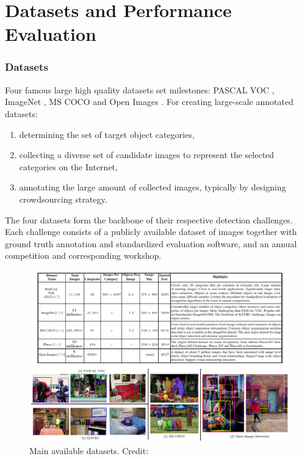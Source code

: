 \documentclass{beamer}
\begin{document}
\part{Datasets and Performance Evaluation}
\begin{frame}
	\partpage
\end{frame}


\section{Datasets}


\begin{frame}
    Four famous large high quality datasets set milestones: PASCAL VOC \cite{everingham_pascal_2010}, ImageNet \cite{krizhevsky_imagenet_2017}, MS COCO \cite{lin_microsoft_2015} and Open Images \cite{kuznetsova_open_2020}. For creating large-scale annotated datasets:
    \begin{enumerate}
        \item determining the set of target object categories,
        \item collecting a diverse set of candidate images to represent the selected categories on the Internet,
        \item annotating the large amount of collected images, typically by designing crowdsourcing strategy.
    \end{enumerate}
    The four datasets form the backbone of their respective detection challenges. Each challenge consists of a publicly available dataset of images together with ground truth annotation and standardized evaluation software, and an annual competition and corresponding workshop.
\end{frame}

\begin{frame}
	\begin{figure}
		\includegraphics[width=\textwidth]{images/datasets.png}
        \caption{Main available datasets.
        \hbox{\scriptsize Credit:}
        }
    \end{figure}
\end{frame}
\end{document}
